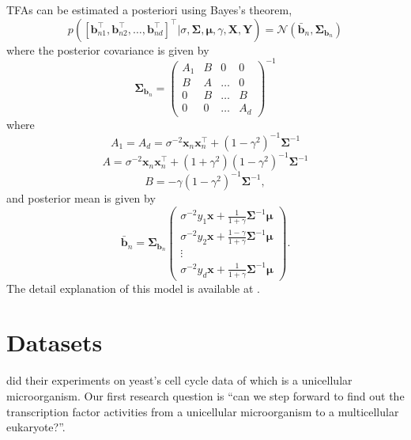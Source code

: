 TFAs can be estimated a posteriori using Bayes’s theorem,
\begin{equation} \label{eq:est_TFA}
 p\left(\left[\textbf{b}^\top_{n1}, \textbf{b}^\top_{n2}, \dots, \textbf{b}^\top_{nd} \right]^\top| \sigma,\boldsymbol{\Sigma},\boldsymbol{\mu},\gamma,\textbf{X},\textbf{Y}\right)= \mathcal{N}\left(\bar{\textbf{b}}_n, \boldsymbol{\Sigma}_{\textbf{b}_n} \right)
\end{equation}
where the posterior covariance is given by
\begin{equation} \label{eq:post_Cov_TFA}
\boldsymbol{\Sigma}_{\textbf{b}_n} = 
 \begin{pmatrix}
  A_1 & B & 0 & 0 \\
  B & A & \dots & 0 \\
  0 & B & \dots & B  \\
  0 & 0 & \dots & A_d
 \end{pmatrix}^{-1}
\end{equation}
where
\begin{equation*}
 A_1 = A_d = \sigma^{-2}\textbf{x}_n\textbf{x}^\top_n+\left(1-\gamma^2\right)^{-1}\boldsymbol{\Sigma}^{-1}
\end{equation*}
\begin{equation*}
 A = \sigma^{-2}\textbf{x}_n\textbf{x}^\top_n+\left(1+\gamma^2\right)\left(1-\gamma^2\right)^{-1}\boldsymbol{\Sigma}^{-1}
\end{equation*}
\begin{equation*}
 B =-\gamma\left(1-\gamma^2\right)^{-1}\boldsymbol{\Sigma}^{-1},
\end{equation*}
and posterior mean is given by
\begin{equation} \label{eq:post_mean_TFA}
\bar{\textbf{b}}_n = \boldsymbol{\Sigma}_{\textbf{b}_n}
 \begin{pmatrix}
  \sigma^{-2}y_1\textbf{x}+\frac{1}{1+\gamma} \boldsymbol{\Sigma}^{-1}\boldsymbol{\mu} \\
  \sigma^{-2}y_2\textbf{x}+\frac{1-\gamma}{1+\gamma} \boldsymbol{\Sigma}^{-1}\boldsymbol{\mu} \\
  \vdots\\
  \sigma^{-2}y_d\textbf{x}+\frac{1}{1+\gamma} \boldsymbol{\Sigma}^{-1}\boldsymbol{\mu}
 \end{pmatrix}.
\end{equation}
The detail explanation of this model is available at \cite{Sanguinetti:2006}.

\section{Datasets}
\cite{Sanguinetti:2006} did their experiments on yeast's cell cycle data of \cite{Spellman:1998} which is a unicellular microorganism. Our first research question is ``can we step forward to find out the transcription factor activities from a unicellular microorganism to a multicellular eukaryote?''. 

